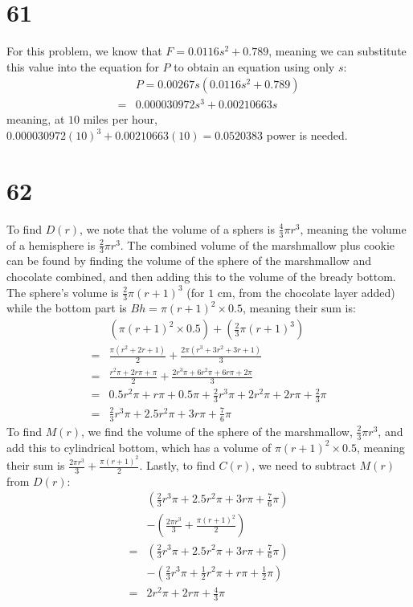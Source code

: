 \documentclass{article}
\theoremstyle{definition}
\begin{document}
\section*{61} 
For this problem, we know that $F=0.0116s^2+0.789$, meaning we can substitute this value into the equation for $P$ to obtain an equation using only 
$s$:
\[
\begin{array}{rl}
	& P=0.00267s(0.0116s^2+0.789) \\
=	& 0.000030972s^3+0.00210663s
\end{array}
\]
meaning, at $10$ miles per hour, $0.000030972(10)^3+0.00210663(10)=0.0520383$ power is needed. 

\section*{62}
To find $D(r)$, we note that the volume of a sphers is $\frac{4}{3}\pi r^3$, meaning the volume of a hemisphere is $\frac{2}{3}\pi r^3$. 
The combined volume of the marshmallow plus cookie can be found by finding the volume of the sphere of the marshmallow and chocolate combined, and 
then adding this to the volume of the bready bottom. The sphere's volume is $\frac{2}{3}\pi (r+1)^3$ (for $1$ cm, from the chocolate layer added) 
while the bottom part is $Bh=\pi (r+1)^2\times 0.5$, meaning their sum is:
\[
\begin{array}{rl} 
	& (\pi(r+1)^2\times 0.5)+(\frac{2}{3}\pi (r+1)^3) \\
=	& \frac{\pi(r^2+2r+1)}{2}+\frac{2\pi(r^3+3r^2+3r+1)}{3} \\
=	& \frac{r^2\pi +2r\pi +\pi}{2}+\frac{2r^3\pi +6r^2\pi +6r\pi +2\pi}{3} \\
=	& 0.5r^2\pi +r\pi +0.5\pi +\frac{2}{3}r^3\pi +2r^2\pi +2r\pi +\frac{2}{3}\pi \\
=	& \frac{2}{3}r^3\pi +2.5r^2\pi +3r\pi +\frac{7}{6}\pi 
\end{array}
\]
To find $M(r)$, we find the volume of the sphere of the marshmallow, $\frac{2}{3}\pi r^3$, and add this to cylindrical bottom, which has a volume of 
$\pi (r+1)^2\times 0.5$, meaning their sum is $\frac{2\pi r^3}{3}+\frac{\pi (r+1)^2}{2}$. Lastly, to find $C(r)$, we need to subtract $M(r)$ from 
$D(r)$:
\[
\begin{array}{rl}
	& (\frac{2}{3}r^3\pi +2.5r^2\pi +3r\pi +\frac{7}{6}\pi) \\
	& -(\frac{2\pi r^3}{3}+\frac{\pi (r+1)^2}{2}) \\
=	& (\frac{2}{3}r^3\pi +2.5r^2\pi +3r\pi +\frac{7}{6}\pi) \\
	& -(\frac{2}{3}r^3\pi +\frac{1}{2}r^2\pi +r\pi +\frac{1}{2}\pi) \\
=	& 2r^2\pi +2r\pi +\frac{4}{3}\pi
\end{array}
\]
\end{document}
